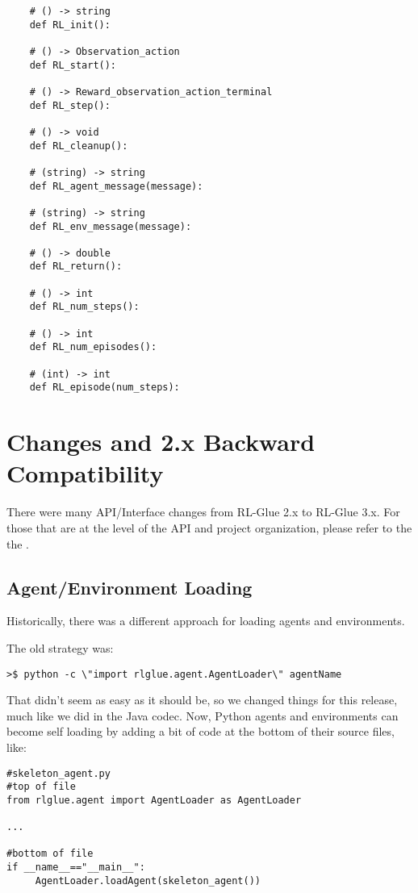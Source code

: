\documentclass[11pt]{article}
\begin{document}
\begin{verbatim}
	# () -> string
	def RL_init():

	# () -> Observation_action
	def RL_start():

	# () -> Reward_observation_action_terminal
	def RL_step():

	# () -> void
	def RL_cleanup():

	# (string) -> string
	def RL_agent_message(message):

	# (string) -> string
	def RL_env_message(message):

	# () -> double
	def RL_return():

	# () -> int
	def RL_num_steps():

	# () -> int
	def RL_num_episodes():

	# (int) -> int
	def RL_episode(num_steps):

\end{verbatim}

\section{Changes and 2.x Backward Compatibility}
There were many API/Interface changes from RL-Glue 2.x to RL-Glue 3.x.  For those that are at the level of the API and project organization, please refer to the the .


\subsection{Agent/Environment Loading}
Historically, there was a different approach for loading agents and environments.

The old strategy was:
\begin{verbatim}
>$ python -c \"import rlglue.agent.AgentLoader\" agentName
\end{verbatim}

That didn't seem as easy as it should be, so we changed things for this release, much like we did in the Java codec. Now, Python agents and environments can become 
self loading by adding a bit of code at the bottom of their source files, like:
\begin{verbatim}
#skeleton_agent.py
#top of file
from rlglue.agent import AgentLoader as AgentLoader

...

#bottom of file
if __name__=="__main__":
     AgentLoader.loadAgent(skeleton_agent())
\end{verbatim}
\end{document}
